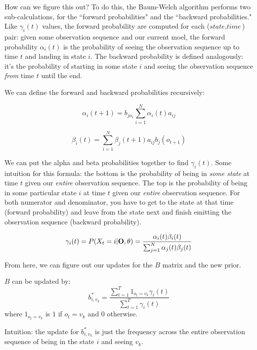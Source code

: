 How can we figure this out? To do this, the Baum-Welch algorithm performs two sub-calculations, for the ``forward probabilities" and the ``backward probabilities."  Like $\gamma_i(t)$ values, the forward probability are computed for each ($\textit{state}, \textit{time}$) pair: given some observation sequence and our current moel, the forward probability $\alpha_i(t)$ is the probability of seeing the observation sequence up to time $t$ and landing in state $i$.  The backward probability is defined analogously: it's the probability of starting in some state $i$ and seeing the observation sequence \textit{from} time $t$ until the end.

We can define the forward and backward probabilities recursively:

\begin{equation} \label{alpha}
\alpha_i(t+1) =  b_{jo_1}\sum_{i=1}^{N} \alpha_i(t)a_{ij}
\end{equation}

\begin{equation} \label{beta}
\beta_i(t) = \sum_{i=1}^N \beta_j(t+1)a_{ij}b_j(o_{t+1})
\end{equation}

We can put the alpha and beta probabilities together to find $\gamma_i(t)$.  Some intuition for this formula: the bottom is the probability of being in \textit{some state} at time $t$ given our \textit{entire} observation sequence.  The top is the probability of being in some particular state $i$ at time $t$ given our \textit{entire} observation sequence.  For both numerator and denominator, you have to get to the state at that time (forward probability) and leave from the state next and finish emitting the observation sequence  (backward probability).

\begin{equation} \label{gamma}
\gamma_i(t) = P(X_t = i | \bold{O}, \theta) = \frac{\alpha_i(t) \beta_i(t)}{\sum_{j=1}^N \alpha_j(t) \beta_j(t)}
\end{equation}

From here, we can figure out our updates for the $B$ matrix and the new prior. 

$B$ can be updated by: 
\begin{equation}\label{b}
b^*_{i,v_k} = \frac{\sum_{t=1}^{T}1_{o_t = v_k} \gamma_i(t)}{\sum_{t=1}^T \gamma_i(t)}
\end{equation}
where $1_{o_t = v_k}$ is $1$ if $o_t = v_k$ and $0$ otherwise. 

Intuition: the update for  $b^*_{i,v_k}$ is just the frequency across the entire observation sequence of being in the state $i$ and seeing $v_k$.

